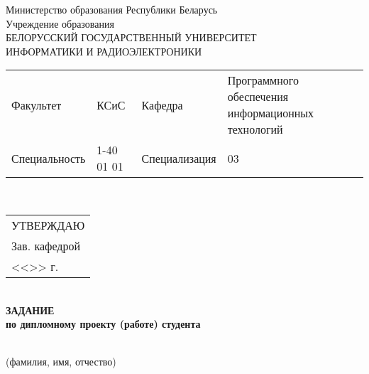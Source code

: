 {
  \thispagestyle{empty}
  \setlength{\parindent}{0em}

  \newcommand{\lineunderscore}{\uline{\hspace*{\fill}}}

  \begin{center}
    Министерство образования Республики Беларусь\\
    Учреждение образования\\
    БЕЛОРУССКИЙ ГОСУДАРСТВЕННЫЙ УНИВЕРСИТЕТ \\
    ИНФОРМАТИКИ И РАДИОЭЛЕКТРОНИКИ\\[1em]
  

  \begin{minipage}{\textwidth}
    \begin{flushleft}
      \begin{tabular}{ p{}p{}p{}p{} @{} }
        Факультет & КСиС & Кафедра & Программного обеспечения информационных технологий \\
        Специальность   & 1-40 01 01 & Специализация & 03
      \end{tabular}
    \end{flushleft}
  \end{minipage}\\[1em]

  \begin{minipage}{\textwidth}
    \begin{flushright}
      \begin{tabular}{p{}}
        УТВЕРЖДАЮ \\[0.5em]
        \underline{\hspace*{7em}} Зав. кафедрой \\
        <<\underline{\hspace*{4ex}}>> \underline{\hspace*{7em}} \currentYear{} г.
      \end{tabular}
    \end{flushright}
  \end{minipage}\\[1em]

  \textbf{ЗАДАНИЕ} \\
  \textbf{по дипломному проекту (работе) студента}

  \lineunderscore \\
  {\small (фамилия, имя, отчество) }

  \end{center}

}
